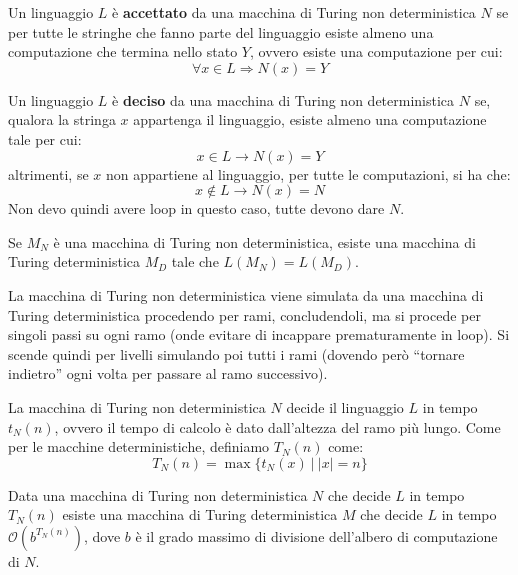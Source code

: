 \begin{definizione}
    Un linguaggio $L$ è \textbf{accettato} da una macchina di Turing non deterministica $N$ se per tutte le stringhe che fanno parte del linguaggio esiste almeno una computazione che termina nello stato $Y$, ovvero esiste una computazione per cui: 
    \begin{equation}
        \forall x \in L \Rightarrow N(x) = Y
    \end{equation}
\end{definizione}
\begin{definizione}
    Un linguaggio $L$ è \textbf{deciso} da una macchina di Turing non deterministica $N$ se, qualora la stringa $x$ appartenga il linguaggio, esiste almeno una computazione tale per cui:
    \begin{equation}
        x \in L \to N(x) = Y
    \end{equation}
    altrimenti, se $x$ non appartiene al linguaggio, per tutte le computazioni, si ha che: 
    \begin{equation}
        x \not\in L \to N(x) = N
    \end{equation}
    Non devo quindi avere loop in questo caso, tutte devono dare $N$.
\end{definizione}
\begin{teorema}
Se $M_N$ è una macchina di Turing non deterministica, esiste una macchina di Turing deterministica $M_D$ tale che $L(M_N) = L(M_D)$.
\end{teorema}
\begin{dimostrazione}
    La macchina di Turing non deterministica viene simulata da una macchina di Turing deterministica procedendo per rami, concludendoli, ma si procede per singoli passi su ogni ramo (onde evitare di incappare prematuramente in loop). Si scende quindi per livelli simulando poi tutti i rami (dovendo però “tornare indietro” ogni volta per passare al ramo successivo).
\end{dimostrazione}

La macchina di Turing non deterministica $N$ decide il linguaggio $L$ in tempo $t_N(n)$, ovvero il tempo di calcolo è dato dall'altezza del ramo più lungo. Come per le macchine deterministiche, definiamo $T_N(n)$ come:
\begin{equation}
    T_N(n) = \max \{t_N(x) \ | \ |x| = n\}
\end{equation}

Data una macchina di Turing non deterministica $N$ che decide $L$ in tempo $T_N(n)$ esiste una macchina di Turing deterministica $M$ che decide $L$ in tempo $\mathcal{O}(b^{T_N(n)})$, dove $b$ è il grado massimo di divisione dell'albero di computazione di $N$.

